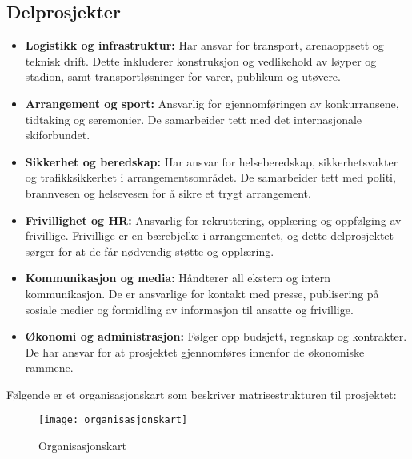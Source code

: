 \subsection*{Delprosjekter}

\begin{itemize}
    \item \textbf{Logistikk og infrastruktur:} Har ansvar for transport, arenaoppsett og teknisk drift. Dette inkluderer konstruksjon og vedlikehold av løyper og stadion, samt transportløsninger for varer, publikum og utøvere.
    
    \item \textbf{Arrangement og sport:} Ansvarlig for gjennomføringen av konkurransene, tidtaking og seremonier. De samarbeider tett med det internasjonale skiforbundet.
    
    \item \textbf{Sikkerhet og beredskap:} Har ansvar for helseberedskap, sikkerhetsvakter og trafikksikkerhet i arrangementsområdet. De samarbeider tett med politi, brannvesen og helsevesen for å sikre et trygt arrangement.
    
    \item \textbf{Frivillighet og HR:} Ansvarlig for rekruttering, opplæring og oppfølging av frivillige. Frivillige er en bærebjelke i arrangementet, og dette delprosjektet sørger for at de får nødvendig støtte og opplæring.
    
    \item \textbf{Kommunikasjon og media:} Håndterer all ekstern og intern kommunikasjon. De er ansvarlige for kontakt med presse, publisering på sosiale medier og formidling av informasjon til ansatte og frivillige.
    
    \item \textbf{Økonomi og administrasjon:} Følger opp budsjett, regnskap og kontrakter. De har ansvar for at prosjektet gjennomføres innenfor de økonomiske rammene.
\end{itemize}
Følgende er et organisasjonskart som beskriver matrisestrukturen til prosjektet:
\begin{figure}[h]
    \centering
    \texttt{[image: organisasjonskart]}
    \caption{Organisasjonskart}
    \label{fig:organisasjonskart}
\end{figure}